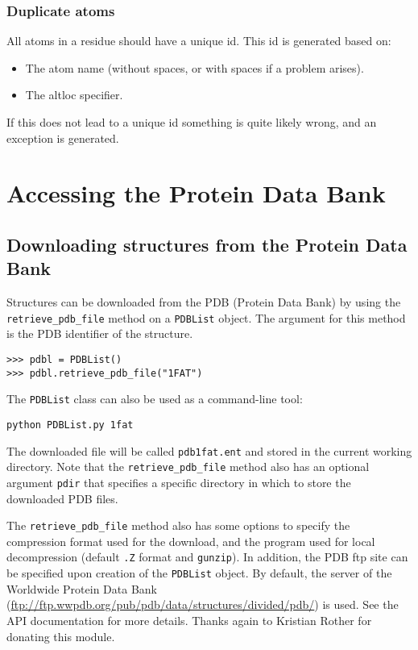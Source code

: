 \subsubsection{Duplicate atoms}

All atoms in a residue should have a unique id. This id is generated based on:

\begin{itemize}
\item The atom name (without spaces, or with spaces if a problem arises).
\item The altloc specifier.
\end{itemize}
If this does not lead to a unique id something is quite likely wrong, and an
exception is generated.

\section{Accessing the Protein Data Bank}

\subsection{Downloading structures from the Protein Data Bank}

Structures can be downloaded from the PDB (Protein Data Bank)
by using the \texttt{retrieve\_pdb\_file} method on a \texttt{PDBList} object.
The argument for this method is the PDB identifier of the structure.

\begin{verbatim}
>>> pdbl = PDBList()
>>> pdbl.retrieve_pdb_file("1FAT")
\end{verbatim}

The \texttt{PDBList} class can also be used as a command-line tool:
\begin{verbatim}
python PDBList.py 1fat
\end{verbatim}
The downloaded file will be called \texttt{pdb1fat.ent} and stored
in the current working directory. Note that the \texttt{retrieve\_pdb\_file}
method also has an optional argument \texttt{pdir} that specifies
a specific directory in which to store the downloaded PDB files.

The \texttt{retrieve\_pdb\_file} method also has some options to specify
the compression format used for the download, and the program used
for local decompression (default \texttt{.Z} format and \texttt{gunzip}).
In addition, the PDB ftp site can be specified upon creation of the
\texttt{PDBList} object. By default, the server of the Worldwide Protein Data Bank (\url{ftp://ftp.wwpdb.org/pub/pdb/data/structures/divided/pdb/})
is used. See the API documentation for more details. Thanks again
to Kristian Rother for donating this module.

